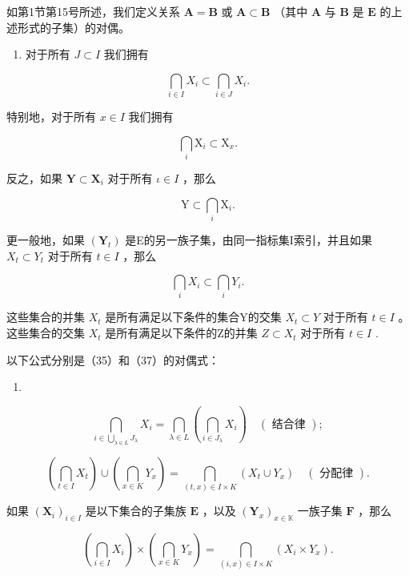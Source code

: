 如第1节第15号所述，我们定义关系 \(\mathbf{A} = \mathbf{B}\) 或 \(\mathbf{A} \subset \mathbf{B}\) （其中 \(\mathbf{A}\) 与 \(\mathbf{B}\) 是 \(\mathbf{E}\) 的上述形式的子集）的对偶。

\begin{enumerate}
\def\labelenumi{\arabic{enumi}.}
\setcounter{enumi}{7}
\tightlist
\item
  对于所有 \(J \subset I\) 我们拥有
\end{enumerate}

\[
\bigcap_ {i \in I} X _ {i} \subset \bigcap_ {i \in J} X _ {i}.
\]

特别地，对于所有 \(x \in I\) 我们拥有

\[
\bigcap_ {i} \mathrm{X} _ {i} \subset \mathrm{X} _ {x}.
\]

反之，如果 \(\mathbf{Y} \subset \mathbf{X}_i\) 对于所有 \(\iota \in I\) ，那么

\[
\mathrm{Y} \subset \bigcap_ {i} \mathrm{X} _ {i}.
\]

更一般地，如果 \((\mathbf{Y}_{t})\) 是E的另一族子集，由同一指标集I索引，并且如果 \(X_{t} \subset Y_{t}\) 对于所有 \(t \in I\) ，那么

\[
\bigcap_ {i} X _ {i} \subset \bigcap_ {i} Y _ {i}.
\]

这些集合的并集 \(X_{t}\) 是所有满足以下条件的集合Y的交集 \(X_{t} \subset Y\) 对于所有 \(t \in I\) 。这些集合的交集 \(X_{t}\) 是所有满足以下条件的Z的并集 \(Z \subset X_{t}\) 对于所有 \(t \in I\) .

以下公式分别是（35）和（37）的对偶式：

\begin{enumerate}
\def\labelenumi{(\arabic{enumi})}
\setcounter{enumi}{40}
\tightlist
\item
\end{enumerate}

\[
\bigcap_ {i \in \bigcup_ {\lambda \in L} J _ {\lambda}} X _ {i} = \bigcap_ {\lambda \in L} \left(\bigcap_ {i \in J _ {\lambda}} X _ {i}\right) \quad (\text { 结合律 });\tag{42}
\]

\[
\left(\bigcap_ {t \in I} X _ {t}\right) \cup \left(\bigcap_ {x \in K} Y _ {x}\right) = \bigcap_ {(t, x) \in I \times K} (X _ {t} \cup Y _ {x}) \quad (\text { 分配律 }).
\]

如果 \((\mathbf{X}_i)_{i\in I}\) 是以下集合的子集族 \(\mathbf{E}\) ，以及 \((\mathbf{Y}_x)_{x\in \mathbb{K}}\) 一族子集 \(\mathbf{F}\) ，那么

\[
\left(\bigcap_ {i \in I} X _ {i}\right) \times \left(\bigcap_ {x \in K} Y _ {x}\right) = \bigcap_ {(i, x) \in I \times K} (X _ {i} \times Y _ {x}).\tag{43}
\]

